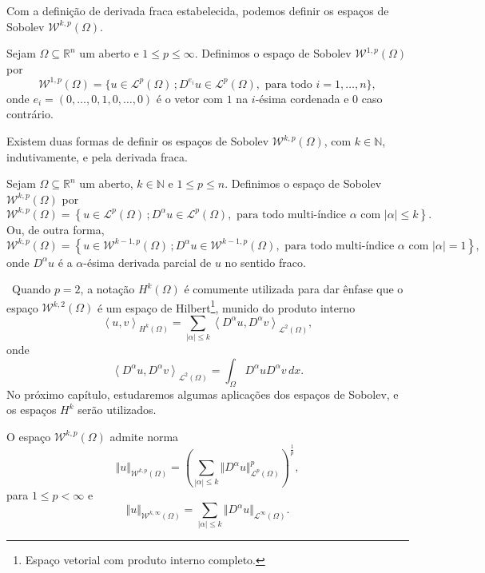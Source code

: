 \documentclass[a4paper, 11pt]{book}
\theoremstyle{definition}
\newcommand{\obs}{\noindent{\textbf{\textcolor{black}{\sffamily Observação:}}}~}
\newcommand{\bN}{\mathbb{N}}
\newcommand{\bR}{\mathbb{R}}
\newcommand{\cL}{\mathcal{L}}
\newcommand{\cW}{\mathcal{W}}
\newcommand{\esssup}{\mathrm{ess\,sup}\,}
\begin{document}
Com a definição de derivada fraca estabelecida, podemos definir os espaços de Sobolev $\cW^{k,p}(\Omega)$.

\begin{dbox}
    Sejam $\Omega \subseteq \bR^n$ um aberto e $1 \leqslant p \leqslant \infty$. 
    Definimos o espaço de Sobolev $\cW^{1,p}(\Omega)$ por
    \[
        \cW^{1,p}(\Omega) = \{u \in \cL^p(\Omega) \,; D^{e_i} u \in \cL^p(\Omega), \text{ para todo } i = 1,\dots,n\},
    \]
    onde $e_i = (0,\dots,0,1,0,\dots,0)$ é o vetor com $1$ na $i$-ésima cordenada e $0$ caso contrário.
\end{dbox}

Existem duas formas de definir os espaços de Sobolev $\cW^{k,p}(\Omega)$, com $k \in \bN$, indutivamente, e pela derivada fraca.

\begin{dbox}
    Sejam $\Omega \subseteq \bR ^n$ um aberto, $k \in \bN$ e $1 \leqslant p \leqslant n$. Definimos o espaço de Sobolev $\cW^{k,p}(\Omega)$ por
    \[
        \cW^{k,p}(\Omega) = \left\{ u \in \cL^p(\Omega) \,; D^\alpha u \in \cL^p(\Omega), \text{ para todo multi-índice } \alpha \text{ com } |\alpha| \leqslant k\right\}.
    \]
    Ou, de outra forma,
    \[
        \cW^{k,p}(\Omega) = \left\{ u \in \cW^{k-1,p}(\Omega) \,; D^\alpha u \in \cW^{k-1,p}(\Omega) , \text{ para todo multi-índice } \alpha \text{ com } |\alpha| = 1\right\},
    \]
    onde $D^\alpha u$ é a $\alpha$-ésima derivada parcial de $u$ no sentido fraco.
\end{dbox}

\obs Quando $p = 2$, a notação $H^{k}(\Omega)$ é comumente utilizada para dar ênfase que o espaço $\cW^{k,2}(\Omega)$ é um espaço de Hilbert\footnote{Espaço vetorial com produto interno completo.}, munido do produto interno
\[
    \left\langle u, v\right\rangle _{H^k(\Omega)} = \sum_{|\alpha| \leqslant k} \left\langle D^\alpha u, D^\alpha v\right\rangle _{\cL^2(\Omega)},
\]
onde
\[
    \left\langle D^\alpha u, D^\alpha v\right\rangle _{\cL^2(\Omega)} = \int_\Omega D^\alpha u D^\alpha v \,dx.
\]
No próximo capítulo, estudaremos algumas aplicações dos espaços de Sobolev, e os espaços $H^k$ serão utilizados.

\begin{dbox}
    O espaço $\cW^{k,p}(\Omega)$ admite norma
    \[
        \Vert u \Vert_{\cW^{k,p}(\Omega)} = \left( \sum_{|\alpha| \leqslant k} \Vert D^\alpha u \Vert_{\cL^p(\Omega)}^p \right)^{\frac{1}{p}},
    \]
    para $1 \leqslant p < \infty$ e 
    \[
        \Vert u \Vert_{\cW^{k,\infty}(\Omega)} 
        = \sum_{|\alpha| \leqslant k} \Vert D^{\alpha}u \Vert_{\cL^\infty(\Omega)}.
    \]
\end{dbox}
\end{document}
